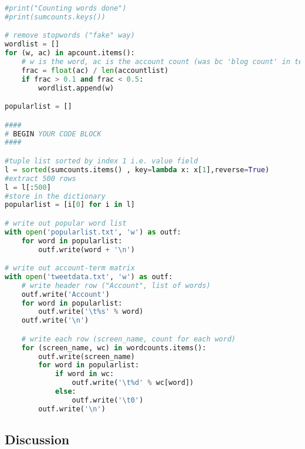 \documentclass[12pt]{article}
\begin{document}
\begin{lstlisting}[language=Python, caption=generatetweetvector.py , label=2nd:copy]
#print("Counting words done")
#print(sumcounts.keys())

# remove stopwords ("fake" way)
wordlist = []
for (w, ac) in apcount.items():
    # w is the word, ac is the account count (was bc 'blog count' in textbook)
    frac = float(ac) / len(accountlist)
    if frac > 0.1 and frac < 0.5:
        wordlist.append(w)

popularlist = []

#### 
# BEGIN YOUR CODE BLOCK
####

#tuple list sorted by index 1 i.e. value field
l = sorted(sumcounts.items() , key=lambda x: x[1],reverse=True)
#extract 500 rows 
l = l[:500]
#store in the dictionary
popularlist = [i[0] for i in l]

# write out popular word list
with open('popularlist.txt', 'w') as outf:
    for word in popularlist:
        outf.write(word + '\n')

# write out account-term matrix
with open('tweetdata.txt', 'w') as outf:
    # write header row ("Account", list of words)
    outf.write('Account')
    for word in popularlist:
        outf.write('\t%s' % word)
    outf.write('\n')

    # write each row (screen_name, count for each word)
    for (screen_name, wc) in wordcounts.items():
        outf.write(screen_name)
        for word in popularlist:
            if word in wc:
                outf.write('\t%d' % wc[word])
            else:
                outf.write('\t0')
        outf.write('\n')


\end{lstlisting}

\subsection*{Discussion}
\end{document}
